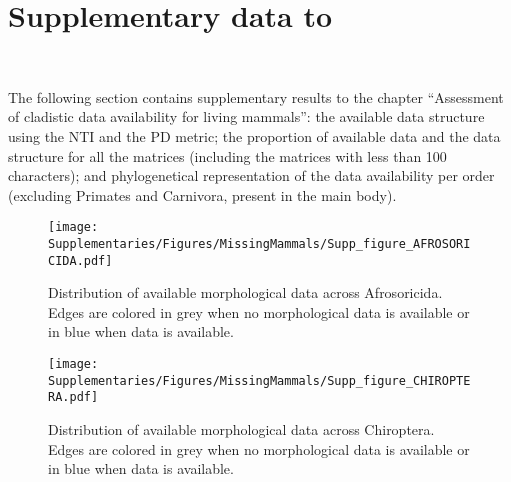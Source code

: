 %
%

\chapter{Supplementary data to }
\label{chap:Appendix_missing_mammals}

\bigskip
\medskip
\begin{center}

 \\
\bigskip
\end{center}
%
%
The following section contains supplementary results to the chapter ``Assessment of cladistic data availability for living mammals'': the available data structure using the NTI and the PD metric; the proportion of available data and the data structure for all the matrices (including the matrices with less than 100 characters); and phylogenetical representation of the data availability per order (excluding Primates and Carnivora, present in the main body).



\begin{figure}[!ht]
\centering
    \texttt{[image: Supplementaries/Figures/MissingMammals/Supp\_figure\_AFROSORICIDA.pdf]}
\caption[Distribution of available morphological data across Afrosoricida]{Distribution of available morphological data across Afrosoricida. Edges are colored in grey when no morphological data is available or in blue when data is available.}
\label{Supp_Figure_Phylo-Afrosoricida}
\end{figure}

\begin{figure}[!ht]
\centering
    \texttt{[image: Supplementaries/Figures/MissingMammals/Supp\_figure\_CHIROPTERA.pdf]}
\caption[Distribution of available morphological data across Chiroptera]{Distribution of available morphological data across Chiroptera. Edges are colored in grey when no morphological data is available or in blue when data is available.}
\label{Supp_Figure_Phylo-Chiroptera}
\end{figure}

